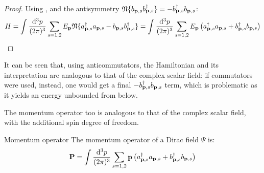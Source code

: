 \begin{proofbox}
\begin{proof}
    Using ,  and the antisymmetry $ \mathfrak{N}\{b_{\mathbf{p},s} b_{\mathbf{p},s}^\dagger\} = - b_{\mathbf{p},s}^\dagger b_{\mathbf{p},s} $:
    \begin{equation*}
      H = \int \frac{\mathrm{d}^3p}{(2\pi)^3} \sum_{s = 1,2} E_{\mathbf{p}} \mathfrak{N}\{a_{\mathbf{p},s}^\dagger a_{\mathbf{p},s} - b_{\mathbf{p},s} b_{\mathbf{p},s}^\dagger\} = \int \frac{\mathrm{d}^3p}{(2\pi)^3} \sum_{s = 1,2} E_{\mathbf{p}} \left( a_{\mathbf{p},s}^\dagger a_{\mathbf{p},s} + b_{\mathbf{p},s}^\dagger b_{\mathbf{p},s} \right)
    \end{equation*}
  \end{proof}

\end{proofbox}

It can be seen that, using anticommutators, the Hamiltonian and its interpretation are analogous to that of the complex scalar field: if commutators were used, instead, one would get a final $ - b_{\mathbf{p},s}^\dagger b_{\mathbf{p},s} $ term, which is problematic as it yields an energy unbounded from below\footnotemark{}.
%

The momentum operator too is analogous to that of the complex scalar field, with the additional spin degree of freedom.

\begin{proposition}{Momentum operator}{}
  The momentum operator of a Dirac field $ \Psi $ is:
  \begin{equation}
    \mathbf{P} = \int \frac{\mathrm{d}^3p}{(2\pi)^3} \sum_{s = 1,2} \mathbf{p} \left( a_{\mathbf{p},s}^\dagger a_{\mathbf{p},s} + b_{\mathbf{p},s}^\dagger b_{\mathbf{p},s} \right)
  \end{equation}
\end{proposition}

